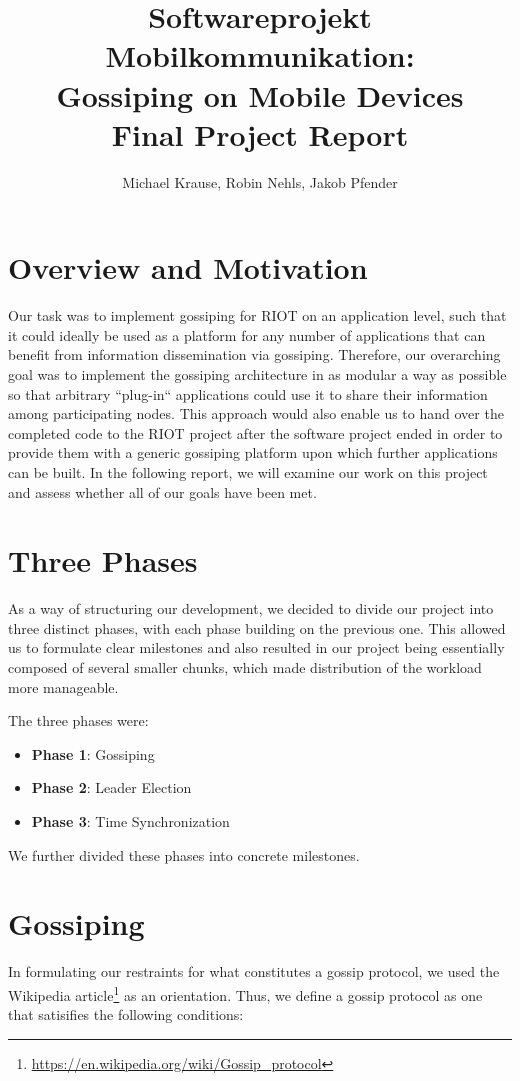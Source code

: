 \documentclass[11pt,
  a4paper,
  ngerman,
  BCOR=7mm
]{scrartcl}
\author{Michael Krause, Robin Nehls, Jakob Pfender}
\title{Softwareprojekt Mobilkommunikation:\\Gossiping on Mobile
Devices\\Final Project Report}
\begin{document}
\maketitle

\newpage

\section*{Overview and Motivation}
\label{sec:overview_motivation}
Our task was to implement gossiping for RIOT on an application level,
such that it could ideally be used as a platform for any number of
applications that can benefit from information dissemination via
gossiping. Therefore, our overarching goal was to implement the
gossiping architecture in as modular a way as possible so that arbitrary
``plug-in`` applications could use it to share their information among
participating nodes. This approach would also enable us to hand over the
completed code to the RIOT project after the software project ended in
order to provide them with a generic gossiping platform upon which
further applications can be built. In the following report, we will
examine our work on this project and assess whether all of our goals
have been met.

\section*{Three Phases}
\label{sec:three_phases}
As a way of structuring our development, we decided to divide our
project into three distinct phases, with each phase building on the
previous one. This allowed us to formulate clear milestones and also
resulted in our project being essentially composed of several smaller
chunks, which made distribution of the workload more manageable.

The three phases were:

\begin{itemize}
  \item \textbf{Phase 1}: Gossiping
  \item \textbf{Phase 2}: Leader Election
  \item \textbf{Phase 3}: Time Synchronization
\end{itemize}

We further divided these phases into concrete milestones.

\newpage

\section*{Gossiping}
\label{sec:gossiping}
In formulating our restraints for what constitutes a gossip protocol, we
used the Wikipedia
article\footnote{\url{https://en.wikipedia.org/wiki/Gossip_protocol}}
as an orientation. Thus, we define a gossip protocol as one that
satisifies the following conditions:
\end{document}
